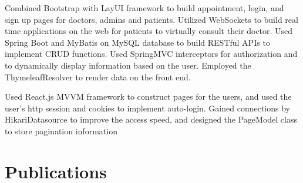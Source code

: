 \documentclass[]{deedy-resume-openfont}
\begin{document}
Combined Bootstrap with LayUI framework to build appointment, login, and sign up pages for doctors, admins and patients. Utilized WebSockets to build real time applications on the web for patients to virtually consult their doctor. Used Spring Boot and MyBatis on MySQL database to build RESTful APIs to implement CRUD functions. Used SpringMVC interceptors for authorization and to dynamically display information based on the user. Employed the ThymeleafResolver to render data on the front end.\\
\sectionsep
  

    
Used React.js MVVM framework to construct pages for the users, and used the user’s http session and cookies to implement auto-login. Gained connections by HikariDatasource to improve the access speed, and designed the PageModel class to store pagination information\\
\sectionsep
%
%
\section{Publications}
 \descript{} \\

\sectionsep
{} \descript{} \\

\sectionsep
{} \descript{} \\

\sectionsep
\ 
\end{document}
